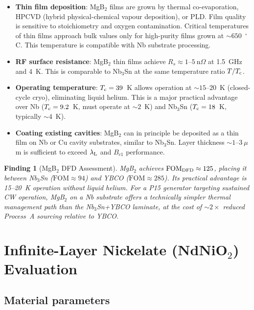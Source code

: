 \documentclass[11pt]{article}
\newtheorem{finding}{Finding}
\newcommand{\lambdaL}{\lambda_{\rm L}}
\newcommand{\Tc}{T_{\rm c}}
\newcommand{\FOM}{\mathrm{FOM}}
\begin{document}
\begin{itemize}
\item \textbf{Thin film deposition}: MgB$_2$ films are grown by thermal
  co-evaporation, HPCVD (hybrid physical-chemical vapour deposition), or
  PLD. Film quality is sensitive to stoichiometry and oxygen contamination.
  Critical temperatures of thin films approach bulk values only for high-purity
  films grown at $\sim 650$~$^\circ$C. This temperature is compatible with
  Nb substrate processing.
\item \textbf{RF surface resistance}: MgB$_2$ thin films achieve
  $R_s \approx 1$--$5~\text{n}\Omega$ at 1.5~GHz and 4~K. This is comparable
  to Nb$_3$Sn at the same temperature ratio $T/\Tc$.
\item \textbf{Operating temperature}: $\Tc = 39$~K allows operation at
  $\sim 15$--$20$~K (closed-cycle cryo), eliminating liquid helium. This
  is a major practical advantage over Nb ($\Tc = 9.2$~K, must operate at
  $\sim 2$~K) and Nb$_3$Sn ($\Tc = 18$~K, typically $\sim 4$~K).
\item \textbf{Coating existing cavities}: MgB$_2$ can in principle be
  deposited as a thin film on Nb or Cu cavity substrates, similar to
  Nb$_3$Sn. Layer thickness $\sim 1$--$3~\mu$m is sufficient to exceed
  $\lambdaL$ and $B_{c1}$ performance.
\end{itemize}

\begin{finding}[MgB$_2$ DFD Assessment]
\label{finding:mgb2}
MgB$_2$ achieves $\FOM_{\rm DFD} \approx 125$, placing it between
Nb$_3$Sn ($\FOM \approx 94$) and YBCO ($\FOM \approx 285$). Its practical
advantage is 15--20~K operation without liquid helium. For a P15 generator
targeting sustained CW operation, MgB$_2$ on a Nb substrate offers a
technically simpler thermal management path than the Nb$_3$Sn+YBCO laminate,
at the cost of $\sim 2\times$ reduced Process~A sourcing relative to YBCO.
\end{finding}

\section{Infinite-Layer Nickelate (NdNiO$_2$) Evaluation}
\label{sec:ndnio2}

\subsection{Material parameters}
\end{document}
